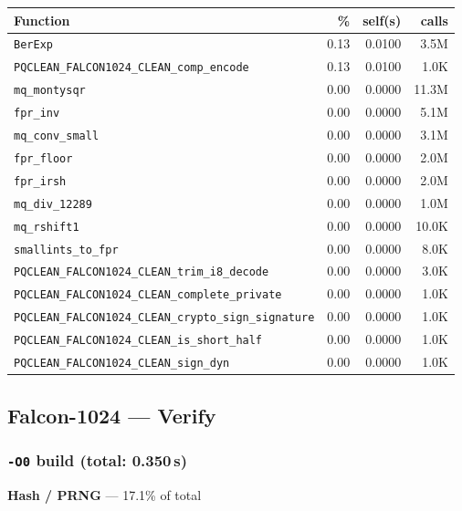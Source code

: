 \documentclass[11pt,a4paper]{article}
\begin{document}
\begin{longtable}{p{7.5cm}rrr}
\toprule
Function & \% & self(s) & calls \\
\midrule
\endhead
  \texttt{BerExp} & 0.13 & 0.0100 & 3.5M \\
  \texttt{PQCLEAN\_FALCON1024\_CLEAN\_comp\_encode} & 0.13 & 0.0100 & 1.0K \\
  \texttt{mq\_montysqr} & 0.00 & 0.0000 & 11.3M \\
  \texttt{fpr\_inv} & 0.00 & 0.0000 & 5.1M \\
  \texttt{mq\_conv\_small} & 0.00 & 0.0000 & 3.1M \\
  \texttt{fpr\_floor} & 0.00 & 0.0000 & 2.0M \\
  \texttt{fpr\_irsh} & 0.00 & 0.0000 & 2.0M \\
  \texttt{mq\_div\_12289} & 0.00 & 0.0000 & 1.0M \\
  \texttt{mq\_rshift1} & 0.00 & 0.0000 & 10.0K \\
  \texttt{smallints\_to\_fpr} & 0.00 & 0.0000 & 8.0K \\
  \texttt{PQCLEAN\_FALCON1024\_CLEAN\_trim\_i8\_decode} & 0.00 & 0.0000 & 3.0K \\
  \texttt{PQCLEAN\_FALCON1024\_CLEAN\_complete\_private} & 0.00 & 0.0000 & 1.0K \\
  \texttt{PQCLEAN\_FALCON1024\_CLEAN\_crypto\_sign\_signature} & 0.00 & 0.0000 & 1.0K \\
  \texttt{PQCLEAN\_FALCON1024\_CLEAN\_is\_short\_half} & 0.00 & 0.0000 & 1.0K \\
  \texttt{PQCLEAN\_FALCON1024\_CLEAN\_sign\_dyn} & 0.00 & 0.0000 & 1.0K \\
\bottomrule
\end{longtable}

\subsection{Falcon-1024 --- Verify}

\subsubsection*{\texttt{-O0} build (total: 0.350\,s)}

\noindent\colorbox{hashcolor}{\strut \textbf{Hash / PRNG} --- 17.1\% of total}
\vspace{2pt}
\end{document}
